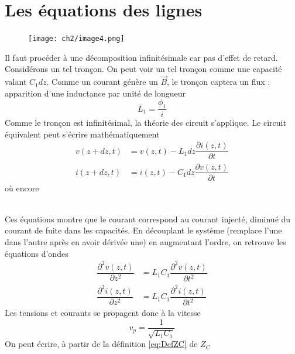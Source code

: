 \section{Les équations des lignes}
\begin{figure}
	\vspace{-5mm}
	\texttt{[image: ch2/image4.png]}
\end{figure}
Il faut procéder à une décomposition infinitésimale car pas d'effet de retard. Considérons 
un tel tronçon. On peut voir un tel tronçon comme une capacité valant $C_1dz$. Comme un courant 
génère un $\vec{B}$, le tronçon captera un flux : apparition d'une inductance par unité de 
longueur
\begin{equation}
L_1 = \dfrac{\phi_1}{i}
\end{equation}
Comme le tronçon est infinitésimal, la théorie des circuit s'applique. Le circuit équivalent 
peut s'écrire mathématiquement
\begin{equation}
\begin{split}
v(z+dz,t) &= v(z,t) - L_1dz\dfrac{\partial i(z,t)}{\partial t}\\
i(z+dz,t) &= i(z,t) - C_1dz\dfrac{\partial v(z,t)}{\partial t}
\end{split}
\end{equation}
où encore\\

\ 

Ces équations montre que le courant correspond au courant injecté, diminué du courant de 
fuite dans les capacités. En découplant le système (remplace l'une dans l'autre après 
en avoir dérivée une) en augmentant l'ordre, on retrouve les équations d'ondes
\begin{equation}
\begin{split}
\dfrac{\partial^2 v(z,t)}{\partial z^2} &= L_1C_1\dfrac{\partial^2 v(z,t)}{\partial t^2}\\
\dfrac{\partial^2 i(z,t)}{\partial z^2} &= L_1C_1\dfrac{\partial^2 i(z,t)}{\partial t^2}
\end{split}
\end{equation}
Les tensions et courants se propagent donc à la vitesse 
\begin{equation}
v_p = \dfrac{1}{\sqrt{L_1C_1}}
\end{equation}
On peut écrire, à partir de la définition \autoref{eq:DefZC} de $Z_C$\\
\ \\

